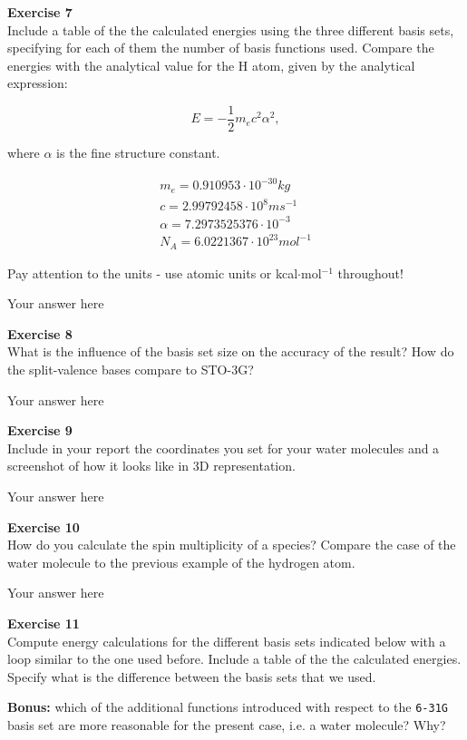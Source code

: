 \documentclass{article}
\begin{document}
\begin{mdframed}
\textbf{Exercise 7}\\
Include a table of the the calculated energies using the three different basis sets, specifying for each of them the number of basis functions used. Compare the energies with the analytical value for the H atom, given by the analytical expression:

\begin{equation}
E = -\frac{1}{2} m_e c^2\alpha^2,
\end{equation}

where $\alpha$ is the fine structure constant.

\begin{align}
m_e = 0.910953\cdot10^{-30} kg\\
c = 2.99792458\cdot10^8 m s^{-1}\\
\alpha = 7.2973525376\cdot10^{-3}\\
N_A = 6.0221367\cdot10^{23}mol^{-1}
\end{align}

Pay attention to the units - use atomic units or kcal$\cdot$mol$^{ -1}$ throughout!
\end{mdframed}

Your answer here

\begin{mdframed}
\textbf{Exercise 8}\\
What is the influence of the basis set size on the accuracy of the result? How do the split-valence bases compare to STO-3G?
\end{mdframed}

Your answer here

\begin{mdframed}
\textbf{Exercise 9}\\
Include in your report the coordinates you set for your water molecules and a screenshot of how it looks like in 3D representation.
\end{mdframed}

Your answer here

\begin{mdframed}
\textbf{Exercise 10}\\
How do you calculate the spin multiplicity of a species? Compare the case of the water molecule to the previous example of the hydrogen atom.
\end{mdframed}

Your answer here

\begin{mdframed}
\textbf{Exercise 11}\\
Compute energy calculations for the different basis sets indicated below with a loop similar to the one used before.  Include a table of the the calculated energies. Specify what is the difference between the basis sets that we used.

\textbf{Bonus:} which of the additional functions introduced with respect to the \texttt{6-31G} basis set are more reasonable for the present case, i.e. a water molecule? Why?
\end{mdframed}
\end{document}

